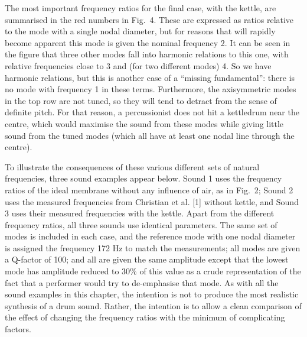   The most important frequency ratios for the final case, with the kettle, are 
  summarised in the red numbers in Fig.\ 4. These are expressed as ratios 
  relative to the mode with a single nodal diameter, but for reasons that will 
  rapidly become apparent this mode is given the nominal frequency 2. It can be 
  seen in the figure that three other modes fall into harmonic relations to 
  this one, with relative frequencies close to 3 and (for two different modes) 
  4. So we have harmonic relations, but this is another case of a ``missing 
  fundamental'': there is no mode with frequency 1 in these terms. Furthermore, 
  the axisymmetric modes in the top row are not tuned, so they will tend to 
  detract from the sense of definite pitch. For that reason, a percussionist 
  does not hit a kettledrum near the centre, which would maximise the sound 
  from these modes while giving little sound from the tuned modes (which all 
  have at least one nodal line through the centre). 


  To illustrate the consequences of these various different sets of natural 
  frequencies, three sound examples appear below. Sound 1 uses the frequency 
  ratios of the ideal membrane without any influence of air, as in Fig.\ 2; 
  Sound 2 uses the measured frequencies from Christian et al. [1] without 
  kettle, and Sound 3 uses their measured frequencies with the kettle. Apart 
  from the different frequency ratios, all three sounds use identical 
  parameters. The same set of modes is included in each case, and the reference 
  mode with one nodal diameter is assigned the frequency 172 Hz to match the 
  measurements; all modes are given a Q-factor of 100; and all are given the 
  same amplitude except that the lowest mode has amplitude reduced to 30\% of 
  this value as a crude representation of the fact that a performer would try 
  to de-emphasise that mode. As with all the sound examples in this chapter, 
  the intention is not to produce the most realistic synthesis of a drum sound. 
  Rather, the intention is to allow a clean comparison of the effect of 
  changing the frequency ratios with the minimum of complicating factors. 

